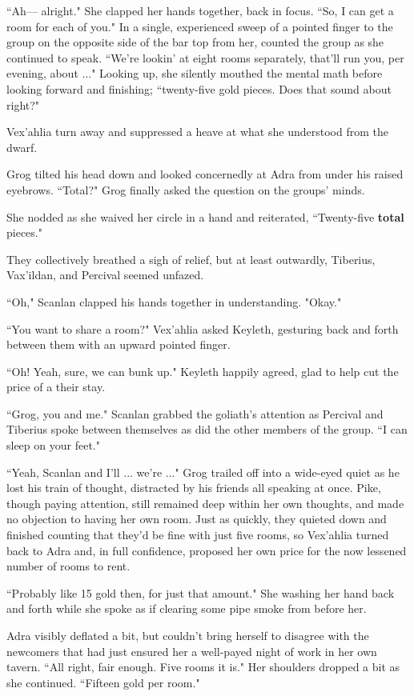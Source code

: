 ``Ah--- alright." She clapped her hands together, back in focus. ``So, I can get a room for each of you." In a single, experienced sweep of a pointed finger to the group on the opposite side of the bar top from her, counted the group as she continued to speak. ``We're lookin' at eight rooms separately, that'll run you, per evening, about ..." Looking up, she silently mouthed the mental math before looking forward and finishing; ``twenty-five gold pieces. Does that sound about right?"

Vex'ahlia turn away and suppressed a heave at what she understood from the dwarf.

Grog tilted his head down and looked concernedly at Adra from under his raised eyebrows. ``Total?" Grog finally asked the question on the groups' minds.

She nodded as she waived her circle in a hand and reiterated, ``Twenty-five \textbf{total} pieces." 

They collectively breathed a sigh of relief, but at least outwardly, Tiberius, Vax'ildan, and Percival seemed unfazed.

``Oh," Scanlan clapped his hands together in understanding. "Okay."

``You want to share a room?" Vex'ahlia asked Keyleth, gesturing back and forth between them with an upward pointed finger.

``Oh! Yeah, sure, we can bunk up." Keyleth happily agreed, glad to help cut the price of a their stay.

``Grog, you and me." Scanlan grabbed the goliath's attention as Percival and Tiberius spoke between themselves as did the other members of the group. ``I can sleep on your feet."

``Yeah, Scanlan and I'll ... we're ..." Grog trailed off into a wide-eyed quiet as he lost his train of thought, distracted by his friends all speaking at once. Pike, though paying attention, still remained deep within her own thoughts, and made no objection to having her own room. Just as quickly, they quieted down and finished counting that they'd be fine with just five rooms, so Vex'ahlia turned back to Adra and, in full confidence, proposed her own price for the now lessened number of rooms to rent.

``Probably like 15 gold then, for just that amount." She washing her hand back and forth while she spoke as if clearing some pipe smoke from before her.

Adra visibly deflated a bit, but couldn't bring herself to disagree with the newcomers that had just ensured her a well-payed night of work in her own tavern. ``All right, fair enough. Five rooms it is." Her shoulders dropped a bit as she continued. ``Fifteen gold per room." 

